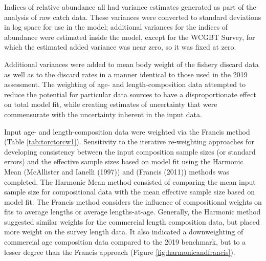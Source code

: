 \documentclass[11pt,
  english,
  a4paper,
]{article}
\begin{document}

Indices of relative abundance all had variance estimates generated as part of the analysis of raw catch data. These variances were converted to standard deviations in log space for use in the model; additional variances for the indices of abundance were estimated inside the model, except for the WCGBT Survey, for which the estimated added variance was near zero, so it was fixed at zero.

\leavevmode\tagmcend\tagstructend\par


Additional variances were added to mean body weight of the fishery discard data as well as to the discard rates in a manner identical to those used in the 2019 assessment. The weighting of age- and length-composition data attempted to reduce the potential for particular data sources to have a disproportionate effect on total model fit, while creating estimates of uncertainty that were commensurate with the uncertainty inherent in the input data.

\leavevmode\tagmcend\tagstructend\par


Input age- and length-composition data were weighted via the Francis method (Table \ref{tab:torctorcw1}). Sensitivity to the iterative re-weighting approaches for developing consistency between the input composition sample sizes (or standard errors) and the effective sample sizes based on model fit using the Harmonic Mean ({McAllister and Ianelli (1997)\leavevmode\tagmcend\tagstructend}) and ({Francis (2011)\leavevmode\tagmcend\tagstructend}) methods was completed. The Harmonic Mean method consisted of comparing the mean input sample size for compositional data with the mean effective sample size based on model fit. The Francis method considers the influence of compositional weights on fits to average lengths or average lengths-at-age. Generally, the Harmonic method suggested similar weights for the commercial length composition data, but placed more weight on the survey length data. It also indicated a downweighting of commercial age composition data compared to the 2019 benchmark, but to a lesser degree than the Francis approach (Figure \ref{fig:harmonicandfrancis}).
\end{document}

